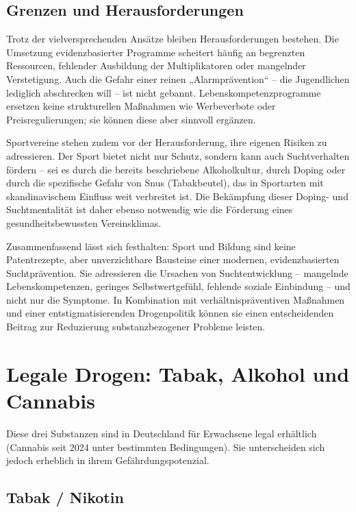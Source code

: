 \documentclass[11pt,a4paper]{article}
\begin{document}
	\subsection{Grenzen und Herausforderungen}
	
	Trotz der vielversprechenden Ansätze bleiben Herausforderungen bestehen. Die Umsetzung evidenzbasierter Programme scheitert häufig an begrenzten Ressourcen, fehlender Ausbildung der Multiplikatoren oder mangelnder Verstetigung. Auch die Gefahr einer reinen „Alarmprävention“ – die Jugendlichen lediglich abschrecken will – ist nicht gebannt. Lebenskompetenzprogramme ersetzen keine strukturellen Maßnahmen wie Werbeverbote oder Preisregulierungen; sie können diese aber sinnvoll ergänzen\cite{life-skills-evaluation}.
	
	Sportvereine stehen zudem vor der Herausforderung, ihre eigenen Risiken zu adressieren. Der Sport bietet nicht nur Schutz, sondern kann auch Suchtverhalten fördern – sei es durch die bereits beschriebene Alkoholkultur, durch Doping oder durch die spezifische Gefahr von Snus (Tabakbeutel), das in Sportarten mit skandinavischem Einfluss weit verbreitet ist\cite{sport-prevention-risks}. Die Bekämpfung dieser Doping- und Suchtmentalität ist daher ebenso notwendig wie die Förderung eines gesundheitsbewussten Vereinsklimas.
	
	Zusammenfassend lässt sich festhalten: Sport und Bildung sind keine Patentrezepte, aber unverzichtbare Bausteine einer modernen, evidenzbasierten Suchtprävention. Sie adressieren die Ursachen von Suchtentwicklung – mangelnde Lebenskompetenzen, geringes Selbstwertgefühl, fehlende soziale Einbindung – und nicht nur die Symptome. In Kombination mit verhältnispräventiven Maßnahmen und einer entstigmatisierenden Drogenpolitik können sie einen entscheidenden Beitrag zur Reduzierung substanzbezogener Probleme leisten.
	
	
	\section{Legale Drogen: Tabak, Alkohol und Cannabis}
	
	Diese drei Substanzen sind in Deutschland für Erwachsene legal erhältlich (Cannabis seit 2024 unter bestimmten Bedingungen). Sie unterscheiden sich jedoch erheblich in ihrem Gefährdungspotenzial.
	
	\subsection{Tabak / Nikotin}
	
\end{document}
